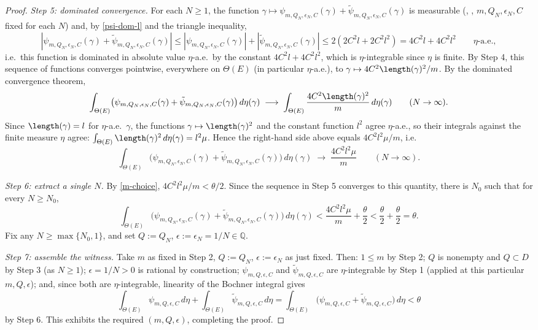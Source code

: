\begin{proof}
  \emph{Step 5: dominated convergence.} For each $N \ge 1$, the function
  $\gamma \mapsto \psi_{m,Q_N,\epsilon_N,C}(\gamma) + \tilde\psi_{m,Q_N,\epsilon_N,C}(\gamma)$ is
  measurable (, , $m,Q_N,\epsilon_N,C$ fixed for
  each $N$) and, by \eqref{psi-dom-l} and the triangle inequality,
  \[
    |\psi_{m,Q_N,\epsilon_N,C}(\gamma)+\tilde\psi_{m,Q_N,\epsilon_N,C}(\gamma)|
    \le |\psi_{m,Q_N,\epsilon_N,C}(\gamma)| + |\tilde\psi_{m,Q_N,\epsilon_N,C}(\gamma)|
    \le 2(2C^2l+2C^2l^2) = 4C^2l+4C^2l^2
    \qquad\eta\text{-a.e.}
    ,
  \]
  i.e.\ this function is dominated in absolute value $\eta$-a.e.\ by the constant $4C^2l+4C^2l^2$,
  which is $\eta$-integrable since $\eta$ is finite. By
  Step 4, this sequence of functions converges pointwise, everywhere on $\Theta(E)$ (in particular
  $\eta$-a.e.), to $\gamma \mapsto 4C^2\length(\gamma)^2/m$. By the dominated convergence theorem,
  \[
    \int_{\Theta(E)} \bigl(\psi_{m,Q_N,\epsilon_N,C}(\gamma)+\tilde\psi_{m,Q_N,\epsilon_N,C}(\gamma)\bigr)
      \,d\eta(\gamma) \;\longrightarrow\; \int_{\Theta(E)} \frac{4C^2\length(\gamma)^2}{m}\,d\eta(\gamma)
    \qquad(N\to\infty)
    .
  \]
  Since $\length(\gamma)=l$ for $\eta$-a.e.\ $\gamma$, the functions $\gamma\mapsto\length(\gamma)^2$
  and the constant function $l^2$ agree $\eta$-a.e., so their integrals against the finite measure
  $\eta$ agree: $\int_{\Theta(E)}\length(\gamma)^2\,d\eta(\gamma) = l^2\mu$. Hence the right-hand
  side above equals $4C^2l^2\mu/m$, i.e.
  \[
    \int_{\Theta(E)} \bigl(\psi_{m,Q_N,\epsilon_N,C}(\gamma)+\tilde\psi_{m,Q_N,\epsilon_N,C}(\gamma)\bigr)
      \,d\eta(\gamma) \;\longrightarrow\; \frac{4C^2l^2\mu}{m}
    \qquad(N\to\infty)
    .
  \]

  \emph{Step 6: extract a single $N$.} By \eqref{m-choice}, $4C^2l^2\mu/m < \theta/2$. Since the
  sequence in Step 5 converges to this quantity, there is $N_0$ such that for every $N \ge N_0$,
  \[
    \int_{\Theta(E)} \bigl(\psi_{m,Q_N,\epsilon_N,C}(\gamma)+\tilde\psi_{m,Q_N,\epsilon_N,C}(\gamma)\bigr)
      \,d\eta(\gamma) < \frac{4C^2l^2\mu}{m} + \frac\theta2 < \frac\theta2+\frac\theta2 = \theta
    .
  \]
  Fix any $N \ge \max\{N_0,1\}$, and set $Q := Q_N$, $\epsilon := \epsilon_N = 1/N \in \mathbb{Q}$.

  \emph{Step 7: assemble the witness.} Take $m$ as fixed in Step 2, $Q := Q_N$, $\epsilon :=
  \epsilon_N$ as just fixed. Then: $1 \le m$ by Step 2; $Q$ is nonempty and $Q \subset D$ by Step 3
  (as $N \ge 1$); $\epsilon = 1/N > 0$ is rational by construction; $\psi_{m,Q,\epsilon,C}$ and
  $\tilde\psi_{m,Q,\epsilon,C}$ are $\eta$-integrable by Step 1 (applied at this particular
  $m,Q,\epsilon$); and, since both are $\eta$-integrable, linearity of the Bochner integral gives
  \[
    \int_{\Theta(E)} \psi_{m,Q,\epsilon,C}\,d\eta + \int_{\Theta(E)} \tilde\psi_{m,Q,\epsilon,C}\,d\eta
      = \int_{\Theta(E)} \bigl(\psi_{m,Q,\epsilon,C}+\tilde\psi_{m,Q,\epsilon,C}\bigr)\,d\eta
      < \theta
  \]
  by Step 6. This exhibits the required $(m,Q,\epsilon)$, completing the proof.
\end{proof}
